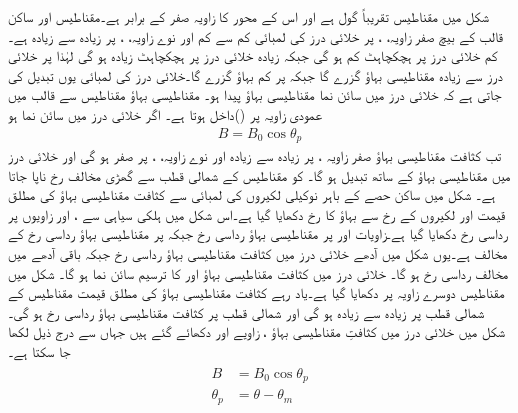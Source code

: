  شکل   میں مقناطیس تقریباً گول ہے اور اس کے محور کا زاویہ  صفر کے برابر ہے۔مقناطیس اور ساکن قالب کے بیچ صفر زاویہ،   ، پر خلائی درز کی لمبائی کم سے کم اور نوے  زاویہ،  ، پر زیادہ سے زیادہ ہے۔کم خلائی درز پر ہچکچاہٹ کم ہو گی جبکہ زیادہ خلائی درز  پر ہچکچاہٹ زیادہ ہو گی لہٰذا  پر خلائی درز سے زیادہ مقناطیسی بہاؤ گزرے گا جبکہ  پر کم بہاؤ گزرے گا۔خلائی درز کی لمبائی یوں تبدیل کی جاتی  ہے کہ  خلائی درز میں سائن نما مقناطیسی بہاؤ پیدا ہو۔ مقناطیسی بہاؤ مقناطیس سے قالب میں عمودی زاویہ پر   ()داخل ہوتا ہے۔  اگر خلائی درز میں  سائن نما ہو
\begin{align}
B=B_0 \cos \theta_p
\end{align}
تب کثافت مقناطیسی بہاؤ  صفر زاویہ ، پر زیادہ سے زیادہ اور نوے زاویہ،  ، پر صفر ہو گی اور خلائی درز میں مقناطیسی بہاؤ   کے ساتھ تبدیل ہو گا۔ کو مقناطیس کے شمالی قطب  سے گھڑی  مخالف رخ ناپا جاتا ہے۔  شکل   میں  ساکن حصے کے باہر نوکیلی لکیروں کی لمبائی  سے  کثافت مقناطیسی بہاؤ کی مطلق قیمت اور لکیروں کے رخ سے بہاؤ کا رخ دکھایا گیا ہے۔اس شکل میں ہلکی سیاہی سے ،  اور  زاویوں پر رداسی رخ  دکھایا گیا ہے۔زاویات  اور    پر مقناطیسی بہاؤ رداسی رخ  جبکہ   پر مقناطیسی بہاؤ رداسی رخ کے مخالف ہے۔یوں شکل  میں  آدھے خلائی درز میں کثافت مقناطیسی بہاؤ  رداسی رخ جبکہ باقی آدھے میں مخالف رداسی رخ ہو گا۔ خلائی درز میں کثافت مقناطیسی بہاؤ  اور   کا ترسیم  سائن نما ہو گا۔ شکل   میں مقناطیس دوسرے زاویہ پر دکھایا گیا ہے۔یاد رہے کثافت مقناطیسی بہاؤ کی مطلق قیمت  مقناطیس کے شمالی قطب پر زیادہ سے زیادہ ہو گی اور شمالی قطب پر کثافت مقناطیسی بہاؤ رداسی رخ ہو گی۔ شکل  میں خلائی درز میں کثافتِ مقناطیسی بہاؤ ، زاویے  اور  دکھائے گئے ہیں جہاں سے درج ذیل لکھا جا سکتا ہے۔
\begin{gather}
\begin{aligned}\label{مساوات_گھومتے_مشین_کثافت_بالمقابل_میکانی_زاویہ}
B&=B_0 \cos \theta_p\\
\theta_p&=\theta-\theta_m
\end{aligned}
\end{gather}
